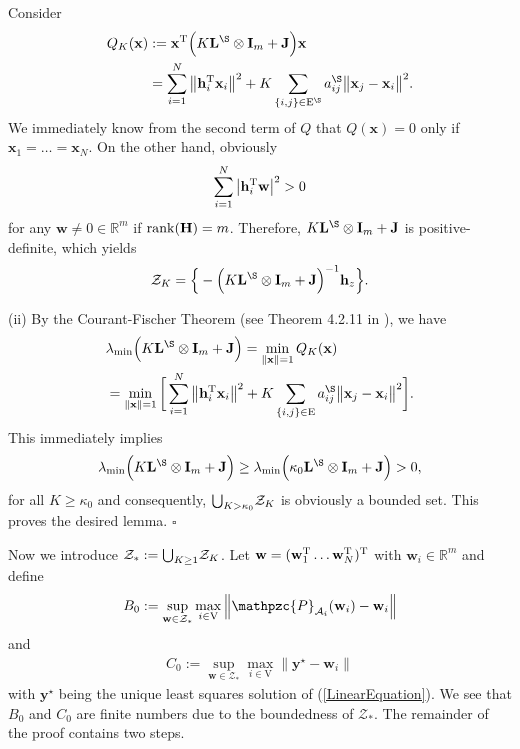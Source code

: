 \documentclass[a4paper, 11pt]{article}
\newcommand*\mcup{\mathbin{\mathpalette\mcupinn\relax}}
\newcommand*\mcupinn[2]{\vcenter{\hbox{$\mathsurround=0pt
  \ifx\displaystyle#1\textstyle\else#1\fi\bigcup$}}}
\def\T{^{\rm\tiny T}}
\begin{document}
Consider
\begin{align*}
Q_K(\mathbf{x})&:=\mathbf{x}\T\Big(K \mathbf{L}^\S\otimes \mathbf{I}_m +\mathbf{J}\Big) \mathbf{x}\nonumber\\
&= \sum_{i=1}^N\big \|\mathbf{h}_i\T \mathbf{x}_i\big\|^2+ {K}\sum_{\{i,j\}\in\mathrm{E}^\S}a_{ij}^\S\big\|\mathbf{x}_j-\mathbf{x}_i\big\|^2.
\end{align*}
We immediately know from the second term of $Q$ that  $Q(\mathbf{x})=0$ only if $\mathbf{x}_1=\dots=\mathbf{x}_N$.  On the other hand,  obviously
$$
\sum_{i=1}^N\big |\mathbf{h}_i\T  \mathbf{w}\big|^2>0
$$
for any $\mathbf{w}\neq 0\in \mathbb{R}^m$ if ${\rm rank}{(\mathbf{H})}=m$. Therefore, $K \mathbf{L}^\S\otimes \mathbf{I}_m +\mathbf{J}$ is positive-definite, which yields
$$
\mathcal{Z}_K=\Big\{ - \Big( K \mathbf{L}^\S\otimes \mathbf{I}_m +\mathbf{J}\Big)^{-1} {\mathbf{h}_z}\Big\}.
$$

\noindent(ii) By the Courant-Fischer Theorem (see Theorem 4.2.11 in \cite{horn}), we have
\begin{align}
&\lambda_{\min}\Big( K \mathbf{L}^\S\otimes \mathbf{I}_m +\mathbf{J}\Big)=\min_{\|\mathbf{x}\|=1}Q_K(\mathbf{x})\nonumber\\
&=\min_{\|\mathbf{x}\|=1} \bigg[ \sum_{i=1}^N\big \|\mathbf{h}_i\T \mathbf{x}_i\big\|^2+ {K}\sum_{\{i,j\}\in\mathrm{E}}a_{ij}^\S\big\|\mathbf{x}_j-\mathbf{x}_i\big\|^2 \bigg].
\end{align}
This immediately implies
\begin{align}
\lambda_{\min}\Big( K \mathbf{L}^\S\otimes \mathbf{I}_m +\mathbf{J}\Big)\geq \lambda_{\min}\Big( {\kappa_0} \mathbf{L}^\S\otimes \mathbf{I}_m +\mathbf{J}\Big)>0,
\end{align}
for all $K\geq  {\kappa_0}$ and consequently,  $\mcup_{K>{\kappa_0}} \mathcal{Z}_K$ is obviously a bounded set. This proves the desired lemma. \hfill$\square$



Now we introduce  $\mathcal{Z}_\ast:=\mcup_{K\geq 1} \mathcal{Z}_K$. Let $\mathbf{w}=(\mathbf{w}_1\T \dots \mathbf{w}_N\T)\T$ with $\mathbf{w}_i\in\mathbb{R}^m$ and define
\begin{align}
{B}_0:= \sup_{\mathbf{w}\in \mathcal{Z}_\ast } \max_{i\in\mathrm{V}}\Big\|\mathpzc{P}_{\mathcal{A}_i}(\mathbf{w}_i)-\mathbf{w}_i\Big\|
 \end{align}
 and
 \begin{align}
{C}_0:= \sup_{\mathbf{w}\in \mathcal{Z}_\ast } \max_{i\in\mathrm{V}}\Big\|\mathbf{y}^\star-\mathbf{w}_i\Big\|
 \end{align}
 with $\mathbf{y}^\star$ being the unique least squares solution of (\ref{LinearEquation}). We see that $B_0$ and $C_0$ are finite numbers due to the boundedness of  $\mathcal{Z}_\ast$. The remainder of the proof contains two steps.
\end{document}
